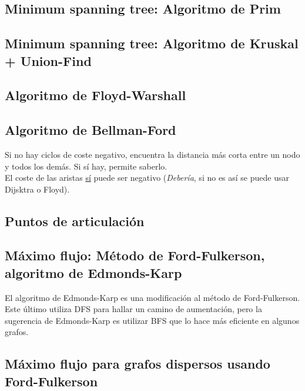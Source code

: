 \documentclass[10pt,letterpaper,twocolumn,twosided]{article}
\newcommand{\codigofuente}[1]{

\dotfill
}
\begin{document}
\subsection{Minimum spanning tree: Algoritmo de Prim}

\codigofuente{./src/grafos/prim.cpp}

\subsection{Minimum spanning tree: Algoritmo de Kruskal + Union-Find}
\codigofuente{./src/grafos/kruskal.cpp}

\subsection{Algoritmo de Floyd-Warshall}
\codigofuente{./src/grafos/floyd.cpp}

\subsection{Algoritmo de Bellman-Ford}
Si no hay ciclos de coste negativo, encuentra la distancia más corta
entre un nodo y todos los demás. Si sí hay, permite saberlo. \\ El
coste de las aristas \underline{sí} puede ser negativo
(\emph{Debería}, si no es así se puede usar Dijsktra o Floyd).
\codigofuente{./src/grafos/bellman.cpp}

\subsection{Puntos de articulación}
\codigofuente{./src/grafos/puntos_articulacion.cpp}

\subsection{Máximo flujo: Método de Ford-Fulkerson, algoritmo de Edmonds-Karp}
El algoritmo de Edmonds-Karp es una modificación al método de Ford-Fulkerson. Este último
utiliza DFS para hallar un camino de aumentación, pero la sugerencia de Edmonds-Karp
es utilizar BFS que lo hace más eficiente en algunos grafos.
\medskip

\codigofuente{./src/grafos/ford_fulkerson.cpp}

\subsection{Máximo flujo para grafos dispersos usando Ford-Fulkerson}
\codigofuente{./src/grafos/ford_fulkerson_sparse.cpp}
\end{document}
